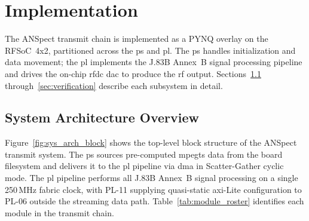 
\chapter{Implementation}
\label{ch:implementation}

The ANSpect transmit chain is implemented as a PYNQ overlay on the
RFSoC~4x2, partitioned across the \ac{ps} and \ac{pl}.
The \ac{ps} handles initialization and data movement; the \ac{pl}
implements the J.83B Annex~B signal processing pipeline and drives
the on-chip \ac{rfdc} \ac{dac} to produce the \ac{rf} output.
Sections~\ref{sec:sys_arch} through~\ref{sec:verification} describe
each subsystem in detail.
 
\section{System Architecture Overview}
\label{sec:sys_arch}

Figure~\ref{fig:sys_arch_block} shows the top-level block structure
of the ANSpect transmit system.
The \ac{ps} sources pre-computed \ac{mpegts} data from the board
filesystem and delivers it to the \ac{pl} pipeline via \ac{dma} in
Scatter-Gather cyclic mode.
The \ac{pl} pipeline performs all J.83B Annex~B signal processing on
a single 250\,MHz fabric clock, with PL-11 supplying quasi-static
\ac{axi}-Lite configuration to PL-06 outside the streaming data path.
Table~\ref{tab:module_roster} identifies each module in the transmit
chain.

